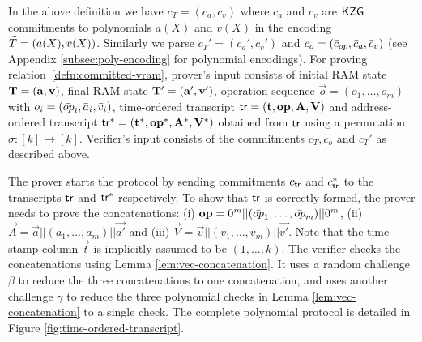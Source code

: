 \noindent In the above definition we have $c_T=(c_a,c_v)$ where $c_a$ and $c_v$ are $\mathsf{KZG}$ commitments to polynomials $a(X)$ and $v(X)$ in
the encoding $\widetilde{T}=(a(X), v(X))$. Similarly we parse $c_T'=(c_a', c_v')$ and $c_o=(\bar{c}_{op}, \bar{c}_a, \bar{c}_v)$ (see Appendix
\ref{subsec:poly-encoding} for polynomial encodings).
For proving relation~\ref{defn:committed-vram}, prover's input consists of initial RAM state $\mathbf{T}=(\mathbf{a},\mathbf{v})$,
final RAM state $\mathbf{T}'=(\mathbf{a'},\mathbf{v'})$, operation sequence $\vec{o}=(o_1,\ldots,o_m)$ with $o_i=(\bar{{op}}_i,\bar{a}_i,\bar{v}_i)$,
time-ordered transcript $\mathsf{tr}=(\mathbf{t},\mathbf{{op}},\mathbf{A},\mathbf{V})$ and address-ordered transcript $\mathsf{tr}^\ast=(\mathbf{t^\ast},\mathbf{{op}^\ast},
\mathbf{A^\ast},\mathbf{V^\ast})$ obtained from $\mathsf{tr}$ using a permutation $\sigma:[k]\rightarrow [k]$.
Verifier's input consists of the commitments $c_T, c_o$ and $c_T'$ as described above.

The prover starts the protocol by sending commitments $c_{\mathsf{tr}}$ and $c^\ast_{\mathsf{tr}}$ to the transcripts $\mathsf{tr}$ and $\mathsf{tr}^\ast$ respectively.
To show that $\mathsf{tr}$ is correctly formed, the prover needs to prove the concatenations:
(i) $\mathbf{{op}}=0^m||(\bar{{op}}_1,\ldots,\bar{{op}}_m)||0^m$, (ii) $\vec{A}=\vec{a}||(\bar{a}_1,\ldots,\bar{a}_m)||\vec{a'}$
and (iii) $\vec{V}=\vec{v}||(\bar{v}_1,\ldots,\bar{v}_m)||\vec{v'}$. Note that the time-stamp column $\vec{t}$ is implicitly assumed
to be $(1,\ldots,k)$.
The verifier checks the concatenations using Lemma \ref{lem:vec-concatenation}.
It uses a random challenge $\beta$ to reduce the three concatenations to one concatenation, and uses another challenge $\gamma$
to reduce the three polynomial checks in Lemma \ref{lem:vec-concatenation} to a single check.
The complete polynomial protocol is detailed in Figure \ref{fig:time-ordered-transcript}.



